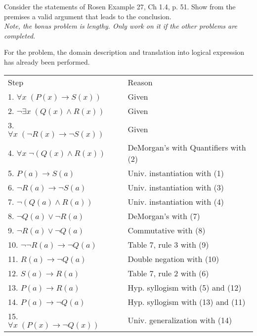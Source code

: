 \documentclass[11pt,addpoints]{exam}
\newcommand{\ra}{\rightarrow}
\begin{document}
\begin{questions}
\bonusquestion[5] Consider the statements of Rosen Example 27, Ch 1.4, p. 51.  Show from the premises a valid argument that leads to the conclusion. \\
\textit{Note, the bonus problem is lengthy.  Only work on it if the other problems are completed.}
 \ifprintanswers
        \vspace{-10pt}
    \fi
\begin{solution}
    For the problem, the domain description and translation into logical expression has already been performed.

    \begin{tabular}{lll}
            Step                    & \hspace{0.15in} & Reason \\
            1. $\forall x\; (P(x) \ra S(x))$            & & Given \\
            2. $\neg \exists x\; (Q(x) \wedge R(x))$    & & Given \\
            3. $\forall x\; (\neg R(x) \ra \neg S(x))$  & & Given \\
            4. $\forall x\; \neg (Q(x) \wedge R(x))$    & & DeMorgan's with Quantifiers with (2) \\
            5. $P(a) \ra S(a)$                          & & Univ. instantiation with (1) \\
            6. $\neg R(a) \ra \neg S(a)$                & & Univ. instantiation with (3) \\
            7. $\neg (Q(a) \wedge R(a))$                & & Univ. instantiation with (4) \\
            8. $\neg Q(a) \vee \neg R(a)$               & & DeMorgan's with (7) \\
            9. $\neg R(a) \vee \neg Q(a)$               & & Commutative with (8) \\
            10. $\neg \neg R(a) \ra \neg Q(a)$          & & Table 7, rule 3 with (9) \\
            11. $R(a) \ra \neg Q(a)$                    & & Double negation with (10) \\
            12. $S(a) \ra R(a)$                         & & Table 7, rule 2 with (6) \\
            13. $P(a) \ra R(a)$                         & & Hyp. syllogism with (5) and (12) \\
            14. $P(a) \ra \neg Q(a)$                    & & Hyp. syllogism with (13) and (11) \\
            15. $\forall x\; (P(x) \ra \neg Q(x))$      & & Univ. generalization with (14)
    \end{tabular}
\end{solution}


\end{questions}
\end{document}
